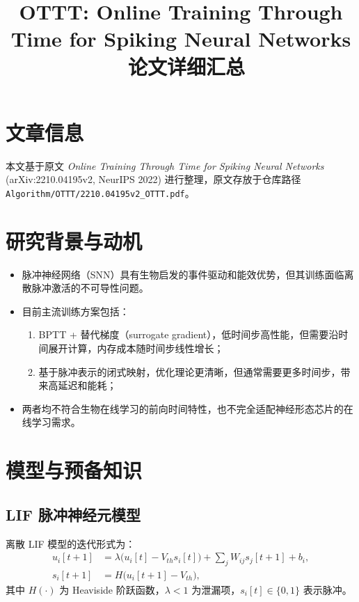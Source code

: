 \documentclass[journal,12pt,onecolumn]{IEEEtran}
\begin{document}
\title{OTTT: Online Training Through Time for Spiking Neural Networks \ 论文详细汇总}
\author{}
\date{}
\maketitle

\section{文章信息}
本文基于原文 \textit{Online Training Through Time for Spiking Neural Networks} \cite{xiao2022online} (arXiv:2210.04195v2, NeurIPS 2022) 进行整理，原文存放于仓库路径 \texttt{Algorithm/OTTT/2210.04195v2\_OTTT.pdf}。

\section{研究背景与动机}
\begin{itemize}[leftmargin=*]
  \item 脉冲神经网络（SNN）具有生物启发的事件驱动和能效优势，但其训练面临离散脉冲激活的不可导性问题。
  \item 目前主流训练方案包括：
    \begin{enumerate}
      \item BPTT + 替代梯度（surrogate gradient），低时间步高性能，但需要沿时间展开计算，内存成本随时间步线性增长；
      \item 基于脉冲表示的闭式映射，优化理论更清晰，但通常需要更多时间步，带来高延迟和能耗；
    \end{enumerate}
  \item 两者均不符合生物在线学习的前向时间特性，也不完全适配神经形态芯片的在线学习需求。
\end{itemize}

\section{模型与预备知识}
\subsection{LIF 脉冲神经元模型}
离散 LIF 模型的迭代形式为：
\begin{align}
  u_i[t+1] &= \lambda\bigl(u_i[t] - V_{th} s_i[t]\bigr) + \sum_j W_{ij}s_j[t+1] + b_i, \\
  s_i[t+1] &= H\bigl(u_i[t+1] - V_{th}\bigr),
\end{align}
其中 $H(\cdot)$ 为 Heaviside 阶跃函数，$\lambda<1$ 为泄漏项，$s_i[t]\in\{0,1\}$ 表示脉冲。
\end{document}

